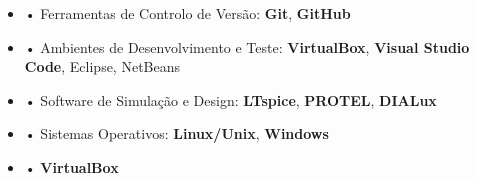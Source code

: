 \documentclass[10pt,a4paper,oneside]{article}
\newlength{\datewidth}
\newlength{\textindent}
\begin{document}
\begin{itemize}
		\item[\hspace{\datewidth}] \parbox[t]{\dimexpr\linewidth-\datewidth-\textindent}{• Ferramentas de Controlo de Versão: \textbf{Git}, \textbf{GitHub}}
		\item[\hspace{\datewidth}] \parbox[t]{\dimexpr\linewidth-\datewidth-\textindent}{• Ambientes de Desenvolvimento e Teste: \textbf{VirtualBox}, \textbf{Visual Studio Code}, Eclipse, NetBeans}
		\item[\hspace{\datewidth}] \parbox[t]{\dimexpr\linewidth-\datewidth-\textindent}{• Software de Simulação e Design: \textbf{LTspice}, \textbf{PROTEL}, \textbf{DIALux}}
		\item[\hspace{\datewidth}] \parbox[t]{\dimexpr\linewidth-\datewidth-\textindent}{• Sistemas Operativos: \textbf{Linux/Unix}, \textbf{Windows}}
		\item[\hspace{\datewidth}] \parbox[t]{\dimexpr\linewidth-\datewidth-\textindent}{• \textbf{VirtualBox}}
	\end{itemize}
	
\end{document}
